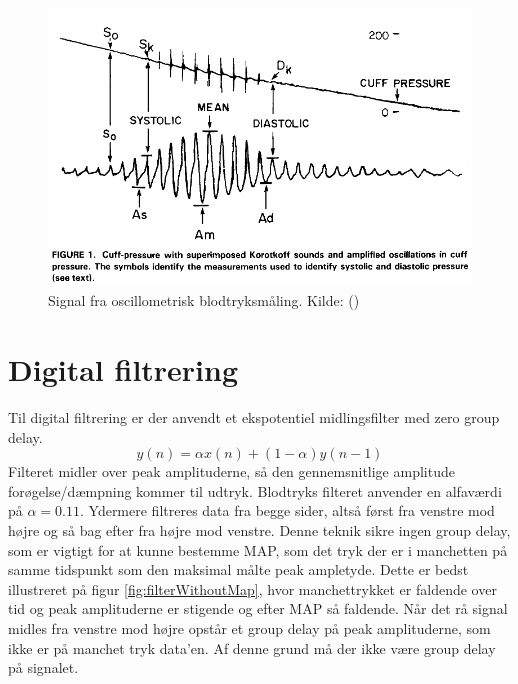 \begin{figure}[H]
	\includegraphics[width=\textwidth]{Implementeringsdokument/billeder/OptimalBlodtryksmaling.png}
	\caption{Signal fra oscillometrisk blodtryksmåling. Kilde: (\cite{RefWorks:8}) }\label{fig:goodMeasurement}
\end{figure}


\section{Digital filtrering} \label{title:digitalFilter}
Til digital filtrering er der anvendt et ekspotentiel midlingsfilter med zero group delay.
\begin{equation}
	y(n) = \alpha x(n)+(1-\alpha )y(n-1)
\end{equation}
Filteret midler over peak amplituderne, så den gennemsnitlige amplitude forøgelse/dæmpning kommer til udtryk. Blodtryks filteret anvender en alfaværdi på $\alpha = 0.11$. Ydermere filtreres data fra begge sider, altså først fra venstre mod højre og så bag efter fra højre mod venstre. Denne teknik sikre ingen group delay, som er vigtigt for at kunne bestemme MAP, som det tryk der er i manchetten på samme tidspunkt som den maksimal målte peak ampletyde. Dette er bedst illustreret på figur \ref{fig:filterWithoutMap}, hvor manchettrykket er faldende over tid og peak amplituderne er stigende og efter MAP så faldende. Når det rå signal midles fra venstre mod højre opstår et group delay på peak amplituderne, som ikke er på manchet tryk data'en. Af denne grund må der ikke være group delay på signalet.

